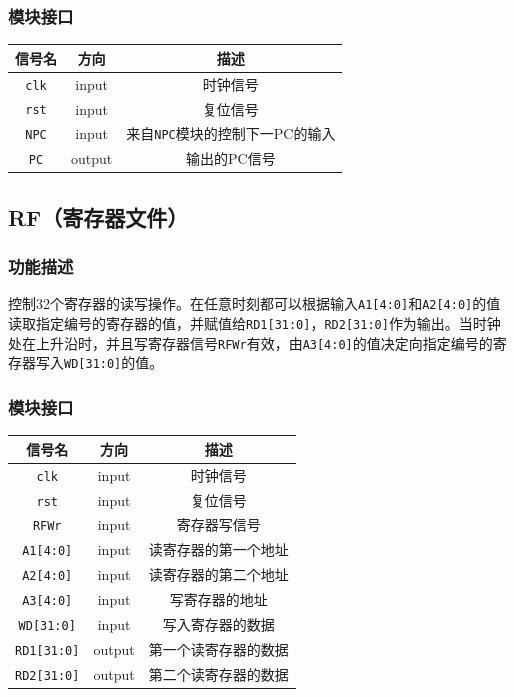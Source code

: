 \documentclass[UTF8,a4paper,autofakebold,15pt]{ctexart}
\begin{document}
\subsubsection{模块接口}
	\begin{center}

	
	\begin{tabular}{|c|c|c|}
		\hline
		信号名&方向&描述\\
		\hline
		{\tt clk}&input&时钟信号\\
		\hline
		{\tt rst}&input&复位信号\\
		\hline
		{\tt NPC}&input&来自{\tt NPC}模块的控制下一PC的输入\\
		\hline
		{\tt PC}&output&输出的PC信号\\
		\hline
	\end{tabular}

	\end{center}

\subsection{RF（寄存器文件）}

\subsubsection{功能描述}

	控制32个寄存器的读写操作。在任意时刻都可以根据输入{\tt A1[4:0]}和{\tt A2[4:0]}的值读取指定编号的寄存器的值，并赋值给{\tt RD1[31:0]}，{\tt RD2[31:0]}作为输出。当时钟处在上升沿时，并且写寄存器信号{\tt RFWr}有效，由{\tt A3[4:0]}的值决定向指定编号的寄存器写入{\tt WD[31:0]}的值。

\subsubsection{模块接口}

	\begin{center}
		
		
		\begin{tabular}{|c|c|c|}
			\hline
			信号名&方向&描述\\
			\hline
			{\tt clk}&input&时钟信号\\
			\hline
			{\tt rst}&input&复位信号\\
			\hline
			{\tt RFWr}&input&寄存器写信号\\
			\hline
			{\tt A1[4:0]}&input&读寄存器的第一个地址\\
			\hline
			{\tt A2[4:0]}&input&读寄存器的第二个地址\\
			\hline
			{\tt A3[4:0]}&input&写寄存器的地址\\
			\hline
			{\tt WD[31:0]}&input&写入寄存器的数据\\
			\hline
			{\tt RD1[31:0]}&output&第一个读寄存器的数据\\
			\hline
			{\tt RD2[31:0]}&output&第二个读寄存器的数据\\
			\hline
		\end{tabular}
		
	\end{center}
\end{document}
